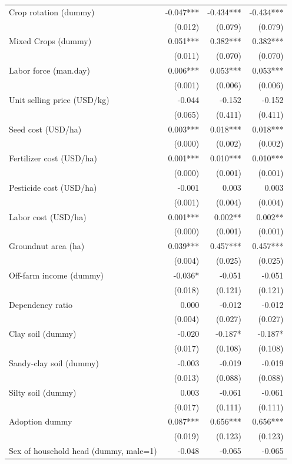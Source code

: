 \documentclass[
]{article}
\begin{document}
\begin{longtable}[t]{lrrr}
Crop rotation (dummy) & -0.047*** & -0.434*** & -0.434***\\
 & (0.012) & (0.079) & (0.079)\\
Mixed Crops (dummy) & 0.051*** & 0.382*** & 0.382***\\
 & (0.011) & (0.070) & (0.070)\\
Labor force (man.day) & 0.006*** & 0.053*** & 0.053***\\
 & (0.001) & (0.006) & (0.006)\\
Unit selling price (USD/kg) & -0.044 & -0.152 & -0.152\\
 & (0.065) & (0.411) & (0.411)\\
Seed cost (USD/ha) & 0.003*** & 0.018*** & 0.018***\\
 & (0.000) & (0.002) & (0.002)\\
Fertilizer cost (USD/ha) & 0.001*** & 0.010*** & 0.010***\\
 & (0.000) & (0.001) & (0.001)\\
Pesticide cost (USD/ha) & -0.001 & 0.003 & 0.003\\
 & (0.001) & (0.004) & (0.004)\\
Labor cost (USD/ha) & 0.001*** & 0.002** & 0.002**\\
 & (0.000) & (0.001) & (0.001)\\
Groundnut area (ha) & 0.039*** & 0.457*** & 0.457***\\
 & (0.004) & (0.025) & (0.025)\\
Off-farm income (dummy) & -0.036* & -0.051 & -0.051\\
 & (0.018) & (0.121) & (0.121)\\
Dependency ratio & 0.000 & -0.012 & -0.012\\
 & (0.004) & (0.027) & (0.027)\\
Clay soil (dummy) & -0.020 & -0.187* & -0.187*\\
 & (0.017) & (0.108) & (0.108)\\
Sandy-clay soil (dummy) & -0.003 & -0.019 & -0.019\\
 & (0.013) & (0.088) & (0.088)\\
Silty soil (dummy) & 0.003 & -0.061 & -0.061\\
 & (0.017) & (0.111) & (0.111)\\
Adoption dummy & 0.087*** & 0.656*** & 0.656***\\
 & (0.019) & (0.123) & (0.123)\\
Sex of household head (dummy, male=1) & -0.048 & -0.065 & -0.065\\

\end{longtable}
\end{document}
